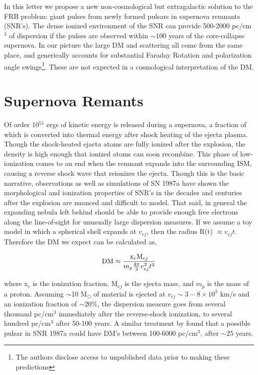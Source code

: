 \documentclass[useAMS,usenatbib]{mn2e}
\begin{document}
In this letter we propose a new non-cosmological but extragalactic
solution to the FRB problem: giant pulses from newly formed pulsars in 
supernova remnants (SNR's). The dense ionized environment of the SNR
can provide 500-2000 pc/cm$^3$ of dispersion if the pulses are observed 
within $\sim100$ years of the core-collapse supernova. In our picture the 
large DM and scattering all come from the same place, and generically
accounts for substantial Faraday Rotation and polarization angle
swings\footnote{\label{disclosure}The authors disclose access to unpublished data prior
  to making these predictions}.
These are not expected in a cosmological interpretation of the DM.



\section{Supernova Remants}
Of order 10$^{51}$ ergs of kinetic energy is released during a supernova, a 
fraction of which is converted into thermal 
energy after shock heating of the 
ejecta plasma. Though the shock-heated ejacta atoms 
are fully ionized after the explosion, the density is high enough that
ionized atoms can soon recombine.
This phase of low-ionization comes to an end when the remnant expands 
into the surrounding ISM, causing a reverse shock wave that reionizes the ejecta.
Though this is the basic narrative, observations \citep{2014ApJ...796...82Z} 
as well as simulations \citep{2014ApJ...794..174P}
of SN 1987a have shown the morphological and ionization properties of SNR's
in the decades and centuries after the explosion are nuanced and 
difficult to model.
That said, in general the expanding nebula left behind 
should be able to provide enough free electrons
along the line-of-sight for unusually large dispersion measures. If we 
assume a toy model in which a spherical shell expands at $v_{ej}$, 
then the radius R(t) $\approx v_{ej} t$. Therefore the DM we expect can be 
calculated as,

\begin{equation}
\textup{DM} \approx  \frac{\textup{x}_e \textup{M}_{ej}}{m_p \frac{4\pi}{3} v_{ej}^2 t^2}
\end{equation}

\noindent where x$_e$ is the ionization fraction, 
M$_{ej}$ is the ejecta mass, and $m_p$ 
is the mass of a proton. Assuming $\sim$10 M$_{\odot}$ of material 
is ejected at $v_{ej}\sim 3-8\times10^3$ km/s and an ionization fraction of 
$\sim 20\% $, the dispersion measure goes from several 
thousand pc/cm$^3$ immediately
after the reverse-shock ionization, to several hundred pc/cm$^3$ after 50-100 years.
A similar treatment by \cite{2014ApJ...796...82Z} found that a possible pulsar in SNR 
1987a could have DM's between 100-6000 pc/cm$^3$, after $\sim 25$ years.
\end{document}
